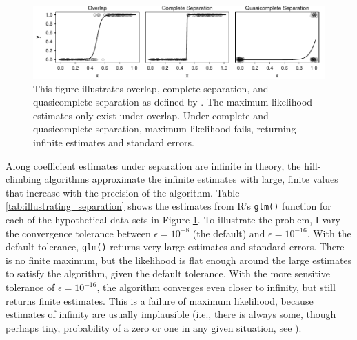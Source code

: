 \documentclass[12pt]{article}
\begin{document}
\begin{figure}[H]
\begin{center}
\includegraphics[scale = 1]{figs/illustrate-separation.pdf}
\end{center}
\caption{This figure illustrates overlap, complete separation, and quasicomplete separation as defined by \cite{AlbertAnderson1984}. The maximum likelihood estimates only exist under overlap. Under complete and quasicomplete separation, maximum likelihood fails, returning infinite estimates and standard errors.}\label{fig:illustrating_separation}
\end{figure}

Along coefficient estimates under separation are infinite in theory, the hill-climbing algorithms approximate the infinite estimates with large, finite values that increase with the precision of the algorithm. Table \ref{tab:illustrating_separation} shows the estimates from R's \texttt{glm()} function for each of the hypothetical data sets in Figure \ref{fig:illustrating_separation}. To illustrate the problem, I vary the convergence tolerance between $\epsilon = 10^{-8}$ (the default) and $\epsilon = 10^{-16}$. With the default tolerance, \texttt{glm()} returns very large estimates and standard errors. There is no finite maximum, but the likelihood is flat enough around the large estimates to satisfy the algorithm, given the default tolerance. With the more sensitive tolerance of $\epsilon = 10^{-16}$, the algorithm converges even closer to infinity, but still returns finite estimates. This is a failure of maximum likelihood, because estimates of infinity are usually implausible (i.e., there is always some, though perhaps tiny, probability of a zero or one in any given situation, see \citealt{HeinzeSchemper2002}). 
\end{document}
